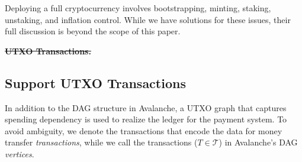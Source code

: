 \documentclass[letterpaper,twocolumn,10pt]{article}
\newcommand{\editremove}[1]{{\color{red}\sout{#1}}}
\newcommand{\editinsert}[1]{{\color{blue}#1}}
\theoremstyle{definition}
\begin{document}
Deploying a full cryptocurrency involves bootstrapping, minting, staking, unstaking,
and inflation control. While we have solutions for these issues, their full discussion is beyond the scope of this paper.



\editremove{\noindent\textbf{UTXO Transactions.}}
\editinsert{\subsection{Support UTXO Transactions}}
In addition to the DAG structure in Avalanche, a UTXO graph that captures
spending dependency is used to realize the ledger for the payment system. To
avoid ambiguity, we denote the transactions that encode the data for money
transfer \emph{transactions}, while we call the
transactions ($T \in \mathcal{T}$) in Avalanche's DAG \emph{vertices}.
\end{document}
